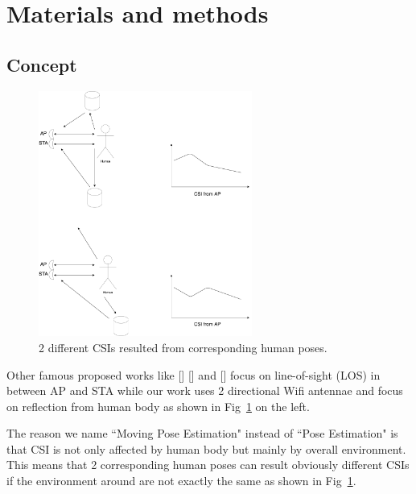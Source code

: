 \documentclass[10pt,letterpaper]{article}
\begin{document}

\section*{Materials and methods}

\subsection*{Concept}
\label{concept}

\begin{figure}[htbp]
	
	\centerline{\includegraphics[width=70mm,scale=0.5]{ESP32CSI02.png}}
	\caption{2 different CSIs resulted from corresponding human poses.}
	\label{fig:ESP32CSI02}
\end{figure}

Other famous proposed works like [] [] and [] focus on line-of-sight (LOS) in between AP and STA while our work uses 2 directional Wifi antennae and focus on reflection from human body as shown in Fig~\ref{fig:ESP32CSI02} on the left.


The reason we name ``Moving Pose Estimation" instead of ``Pose Estimation" is that CSI is not only affected by human body but mainly by overall environment. This means that 2 corresponding human poses can result obviously different CSIs if the environment around are not exactly the same as shown in Fig~\ref{fig:ESP32CSI02}.
\end{document}
